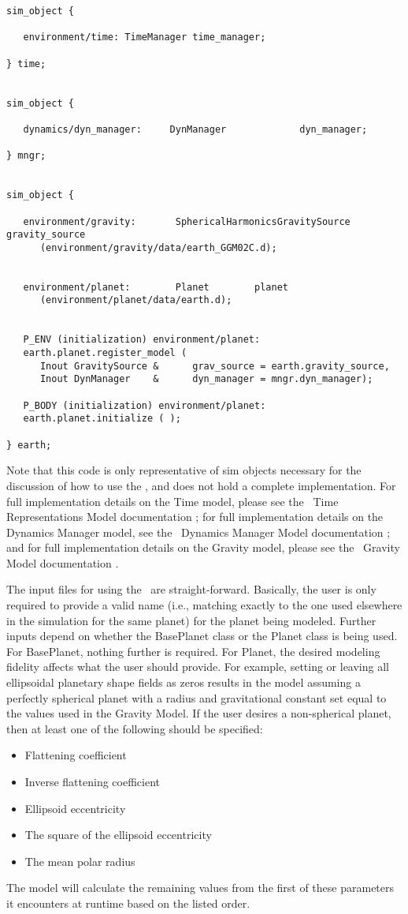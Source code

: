\begin{verbatim}
sim_object {

   environment/time: TimeManager time_manager;

} time;


sim_object {

   dynamics/dyn_manager:     DynManager             dyn_manager;

} mngr;


sim_object { 

   environment/gravity:       SphericalHarmonicsGravitySource   gravity_source
      (environment/gravity/data/earth_GGM02C.d);


   environment/planet:        Planet        planet
      (environment/planet/data/earth.d);


   P_ENV (initialization) environment/planet:
   earth.planet.register_model (
      Inout GravitySource &      grav_source = earth.gravity_source,
      Inout DynManager    &      dyn_manager = mngr.dyn_manager);

   P_BODY (initialization) environment/planet:
   earth.planet.initialize ( );

} earth;
\end{verbatim}

Note that this code is only representative of sim objects necessary for the
discussion of how to use the \planetDesc, and does not hold a
complete implementation. For full implementation details on the Time model,
please see the \JEODid\ Time Representations Model documentation
\cite{dynenv:TIME}; for full implementation details on the Dynamics Manager
model, see the \JEODid\ Dynamics Manager Model documentation
\cite{dynenv:DYNMANAGER}; and for full implementation details on the Gravity
model, please see the \JEODid\ Gravity Model documentation
\cite{dynenv:GRAVITY}.

The input files for using the \planetDesc\ are straight-forward. Basically, the user
is only required to provide a valid name (i.e., matching exactly to the one used
elsewhere in the simulation for the same planet) for the planet being modeled.
Further inputs depend on whether the BasePlanet class or the Planet class is
being used. For BasePlanet, nothing further is required. For Planet, the desired
modeling fidelity affects what the user should provide. For example, setting or
leaving all ellipsoidal planetary shape fields as zeros results in
the model assuming a perfectly spherical planet with a radius and gravitational
constant set equal to the values used in the Gravity Model. If the user desires
a non-spherical planet, then at least one of the following should be specified:
\begin{itemize}
\item Flattening coefficient
\item Inverse flattening coefficient
\item Ellipsoid eccentricity
\item The square of the ellipsoid eccentricity
\item The mean polar radius
\end{itemize}
The model will calculate the remaining values from the first of these
parameters it encounters at runtime based on the listed order.

